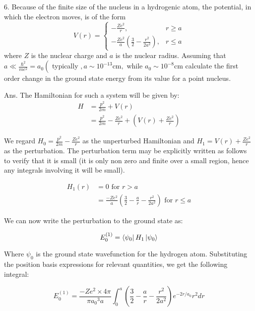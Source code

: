6. Because of the finite size of the nucleus in a hydrogenic atom, the potential, in which the electron moves, is of the form
$$
V(r)=\left\{\begin{array}{cc}
-\frac{Z e^{2}}{r}, & r \geq a \\
-\frac{Z e^{2}}{a}\left(\frac{3}{2}-\frac{r^{2}}{2 a^{2}}\right), & r \leq a
\end{array}\right.
$$
where $Z$ is the nuclear charge and $a$ is the nuclear radius. Assuming that $a \ll \frac{\hbar^{2}}{m e^{2}}=a_{0}\left(\right.$ typically $, a \sim 10^{-13} \mathrm{cm},$ while $a_{0} \sim 10^{-8} \mathrm{cm}$
calculate the first order change in the ground state energy from its value for a point nucleus.

Ans. The Hamiltonian for such a system will be given by:
\begin{equation}
\begin{split}
    H &= \frac{p^2}{2m} + V(r)\\
    &= \frac{p^2}{2m} - \frac{Ze^2}{r} + \left( V(r) +  \frac{Ze^2}{r} \right)
\end{split}
\end{equation}

We regard $H_0 =  \frac{p^2}{2m} - \frac{Ze^2}{r} $ as the unperturbed Hamiltonian and $H_1 =  V(r) +  \frac{Ze^2}{r}$ as the perturbation. The perturbation term may be explicitly written as follows to verify that it is small (it is only non zero and finite over a small region, hence any integrals involving it will be small).

\begin{equation}
    \begin{split}
        H_1(r) &= 0 \text{ for } r>a\\
        &= \frac{-Ze^2}{a} \left( \frac{3}{2} - \frac{a}{r} - \frac{r^2}{2a^2} \right) \text{ for } r \leq a
    \end{split}
\end{equation}

We can now write the perturbation to the ground state as:

\begin{equation}
    E^{(1)}_0 = \bra{\psi_0} H_1 \ket{\psi_0}
\end{equation}

Where $\psi_0$ is the ground state wavefunction for the hydrogen atom. Substituting the position basis expressions for relevant quantities, we get the following integral:

\begin{equation}
    E^{(1)}_0 = \frac{-Ze^2 \times 4 \pi}{\pi {a_0}^3 a} \int_0^a \left( \frac{3}{2} - \frac{a}{r} - \frac{r^2}{2a^2} \right) e^{-2r/a_0} r^2 dr
\end{equation}

